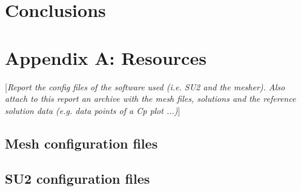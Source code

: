 \documentclass[10pt,english, openany]{book}
\begin{document}
\chapter{Conclusions}

\pagebreak





\pagebreak

\chapter*{Appendix A: Resources}
[\textit{Report the config files of the software used (i.e. SU2 \cite{economon2015su2} and the mesher). Also attach to this report an archive with the mesh files, solutions and the reference solution data (e.g. data points of a Cp plot ...)}]
\section*{Mesh configuration files}
\section*{SU2 configuration files}
\end{document}
